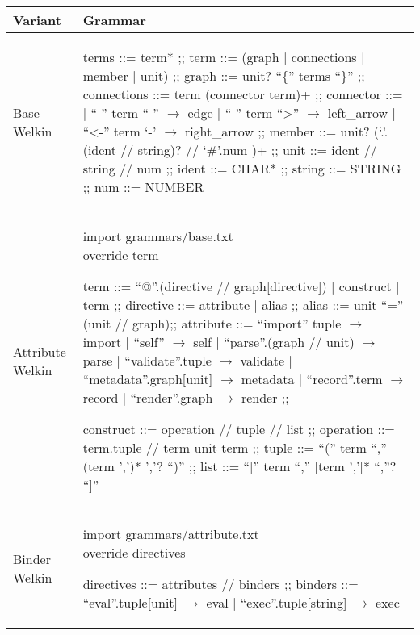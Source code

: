 \begin{table}[hbt!]
  \centering
    \begin{tabular}{| p{1.5cm} | p{9.5cm} |}%
    \hline
    Variant & Grammar \\\hline %
      \makecell{Base \\ Welkin} &
  \begin{bnf}
  terms ::= term* ;;
  term ::= (graph | connections | member | unit) ;;
  graph ::= unit? ``\{'' terms ``\}'' ;;
  connections ::= term (connector term)+ ;;
	connector ::=
   | ``-'' term ``-'' $\to$ edge
   | ``-'' term ``>'' $\to$ left\_arrow
	 | ``<-'' term `-' $\to$ right\_arrow ;;
  member ::= unit? (`.'.(ident // string)? // `\#'.num )+ ;;
	unit ::= ident // string // num ;;
  ident ::= CHAR* ;;
	string ::= STRING ;;
	num ::= NUMBER
\end{bnf} \\ %
   \hline
      Attribute Welkin &
  \makecell{import grammars/base.txt \\ override term}
  \begin{bnf}

  term ::= ``@''.(directive // graph[directive]) | construct | term ;;
  directive ::= attribute | alias ;;
  alias ::= unit ``\:='' (unit // graph);;
  attribute ::= ``import'' tuple $\to$ import
  | ``self'' $\to$ self
  | ``parse''.(graph // unit) $\to $ parse
  | ``validate''.tuple $\to$ validate
  | ``metadata''.graph[unit] $\to$ metadata
  | ``record''.term $\to$ record
  | ``render''.graph $\to$ render ;;

  construct ::= operation // tuple // list ;;
  operation ::= term.tuple // term unit term ;;
  tuple ::= ``('' term ``,'' (term ',')* ','? ``)'' ;;
  list ::= ``['' term ``,'' [term ',']* ``,''? ``]''
 \end{bnf} \\
   \hline
   Binder Welkin &
\makecell{import grammars/attribute.txt \\ override directives}
    \begin{bnf}
     directives ::= attributes // binders ;;
     binders ::= ``eval''.tuple[unit] $\to$ eval
     | ``exec''.tuple[string] $\to$ exec
   \end{bnf} \\ %
    \hline
    \end{tabular}
  \end{table}

